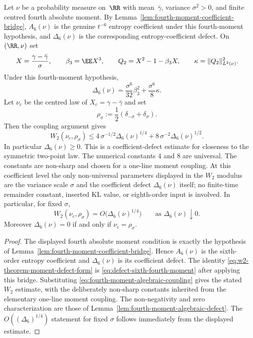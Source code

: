 \begin{corollary}%
\label{cor:coefficient-defect-coupling}
Let $\nu$ be a probability measure on~$\RR$ with mean~$\bar{\gamma}$,
variance $\sigma^2>0$, and finite centred fourth absolute moment.
By Lemma~\ref{lem:fourth-moment-coefficient-bridge}, \(A_6(\nu)\) is the genuine
\(t^{-6}\) entropy coefficient under this fourth-moment hypothesis, and
\(\Delta_6(\nu)\) is the corresponding entropy-coefficient defect.
On $(\RR,\nu)$ set
\[
X=\frac{\gamma-\bar{\gamma}}{\sigma},
\qquad
\beta_3=\EE X^3,
\qquad
Q_2=X^2-1-\beta_3X,
\qquad
\kappa=\|Q_2\|_{L^2(\nu)}^2 .
\]
Under this fourth-moment hypothesis,
\begin{equation}\label{eq:w2-theorem-moment-defect-form}
\Delta_6(\nu)
=\frac{\sigma^6}{32}\beta_3^2+\frac{\sigma^6}{8}\kappa .
\end{equation}
Let $\nu_c$ be the centred law of $X_c=\gamma-\bar{\gamma}$ and set
\[
\rho_\sigma:=\frac12(\delta_{-\sigma}+\delta_\sigma).
\]
Then the coupling argument gives
\[
W_2(\nu_c,\rho_\sigma)
\le
4\,\sigma^{-1/2}\Delta_6(\nu)^{1/4}
+8\,\sigma^{-2}\Delta_6(\nu)^{1/2}.
\]
In particular \(\Delta_6(\nu)\ge0\).  This is a coefficient-defect estimate for
closeness to the symmetric two-point law.  The numerical constants $4$ and
$8$ are universal.  The constants are non-sharp and chosen for a one-line
moment coupling.  At this coefficient level the only non-universal
parameters displayed in the \(W_2\) modulus are the variance scale $\sigma$
and the coefficient defect \(\Delta_6(\nu)\) itself; no finite-time remainder
constant, inserted KL value, or eighth-order input is involved.
In particular, for fixed $\sigma$,
\[
W_2(\nu_c,\rho_\sigma)=O\!\bigl(\Delta_6(\nu)^{1/4}\bigr)
\qquad\text{as }\Delta_6(\nu)\downarrow 0.
\]
Moreover \(\Delta_6(\nu)=0\) if and only if
\(\nu_c=\rho_\sigma\).
\end{corollary}

\begin{proof}
The displayed fourth absolute moment condition is exactly the hypothesis
of Lemma~\ref{lem:fourth-moment-coefficient-bridge}.  Hence \(A_6(\nu)\) is the
sixth-order entropy coefficient and \(\Delta_6(\nu)\) is its
coefficient defect.
The identity \eqref{eq:w2-theorem-moment-defect-form} is
\eqref{eq:defect-sixth-fourth-moment} after applying this bridge.
Substituting
\eqref{eq:fourth-moment-algebraic-coupling} gives the stated $W_2$ estimate,
with the deliberately non-sharp constants inherited from the elementary
one-line moment coupling.  The non-negativity and zero characterization are
those of Lemma~\ref{lem:fourth-moment-algebraic-defect}.
The \(O((\Delta_6)^{1/4})\) statement for fixed \(\sigma\)
follows immediately from the displayed estimate.
\end{proof}

